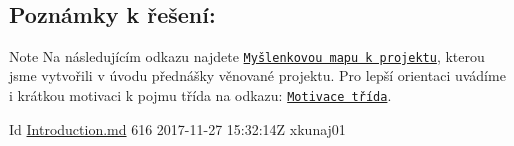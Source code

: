 ~\newline
\subsection*{Poznámky k řešení\+:}

\begin{DoxyNote}{Note}
Na následujícím odkazu najdete \href{https://my.mindnode.com/s2Bbn2gFS8pHZFGcZJhRj4U7zmxx8ivygkoPCuZz}{\tt Myšlenkovou mapu k projektu}, kterou jsme vytvořili v úvodu přednášky věnované projektu. Pro lepší orientaci uvádíme i krátkou motivaci k pojmu třída na odkazu\+: \href{http://www.uamt.feec.vutbr.cz/~richter/vyuka/1314_ppc/bppc/cviceni/motivace_trida.html}{\tt Motivace třída}. ~\newline
 
\end{DoxyNote}
\begin{DoxyParagraph}{Id}
\hyperlink{_introduction_8md}{Introduction.\+md} 616 2017-\/11-\/27 15\+:32\+:14Z xkunaj01 
\end{DoxyParagraph}
